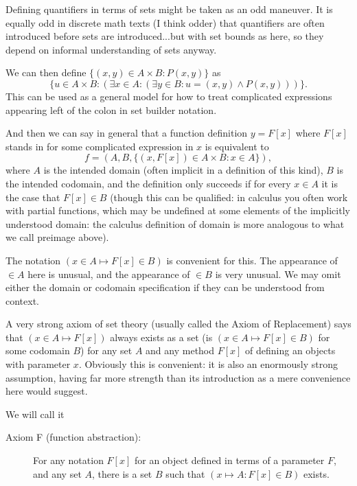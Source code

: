 \documentclass[12pt]{article}
\begin{document}
\begin{description}
Defining quantifiers in terms of sets might be taken as an odd maneuver.  It is equally odd in discrete math texts (I think odder) that quantifiers are often introduced before sets are introduced...but with set bounds as here, so they depend on informal understanding of sets anyway.

We can then define $\{(x,y) \in A \times B:P(x,y)\}$ as $$\{u \in A \times B:(\exists x \in A:(\exists y \in B:u=(x,y) \wedge P(x,y)))\}.$$ This can be used as a general model for how to treat complicated expressions appearing left of the colon in set builder notation.

And then we can say in general that a function definition $y = F[x]$ where $F[x]$ stands in for some complicated expression in $x$ is equivalent to $$f=(A,B,\{(x,F[x]) \in A \times B:x\in A\}),$$  where $A$ is the intended domain (often implicit in a definition of this kind), $B$ is the intended codomain, and the definition only succeeds if for every $x \in A$ it is the case that $F[x] \in B$ (though this can be qualified:  in calculus you often work with partial functions, which may be undefined at some elements of the implicitly understood domain:  the calculus definition of domain is more analogous to what we call preimage above).

The notation $(x \in A \mapsto F[x] \in B)$ is convenient for this.  The appearance of $\in A$ here is unusual, and the appearance of $\in B$ is very unusual.  We may omit either the domain or codomain specification if they can be understood from context.   

A very strong axiom of set theory (usually called the Axiom of Replacement) says that $(x \in A \mapsto F[x])$ always exists as a set (is $(x \in A \mapsto F[x]\in B)$ for some codomain $B$) for any set $A$ and any method $F[x]$ of defining an objects with parameter $x$.  Obviously this is convenient:  it is also an enormously strong assumption, having far more strength than its introduction as a mere convenience here would suggest.

We will call it

\begin{description}

\item[Axiom F (function abstraction):]  For any notation $F[x]$ for an object defined in terms of a parameter $F$, and any set $A$,
there is a set $B$ such that $(x \mapsto A:F[x] \in B)$ exists.  

\end{description}


\end{description}
\end{document}
